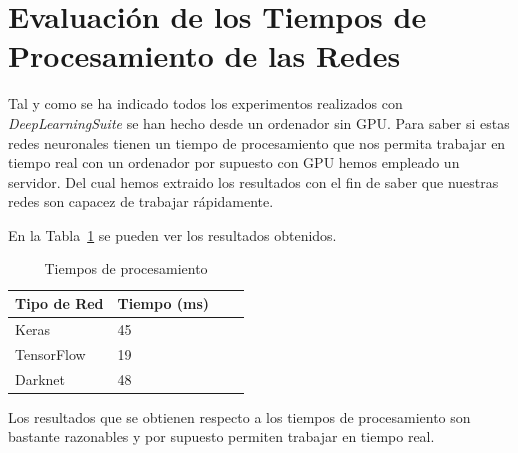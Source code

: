 \section{Evaluación de los Tiempos de Procesamiento de las Redes}

Tal y como se ha indicado todos los experimentos realizados con \textit{DeepLearningSuite} se han hecho desde un ordenador sin GPU. Para saber si estas redes neuronales tienen un tiempo de procesamiento que nos permita trabajar en tiempo real con un ordenador por supuesto con GPU hemos empleado un servidor. Del cual hemos extraido los resultados con el fin de saber que nuestras redes son capacez de trabajar rápidamente.

En la Tabla~\ref{tiempos} se pueden ver los resultados obtenidos.

\begin{table}[H]
\begin{center}
\begin{tabular}{|l|l|l|l|}
\hline
Tipo de Red & Tiempo (ms)  \\ 
\hline \hline
Keras & 45 \\ \hline
TensorFlow & 19 \\ \hline
Darknet & 48 \\ \hline
\end{tabular}
\caption{Tiempos de procesamiento}
\label{tiempos}
\end{center}
\end{table}

Los resultados que se obtienen respecto a los tiempos de procesamiento son bastante razonables y por supuesto permiten trabajar en tiempo real.

